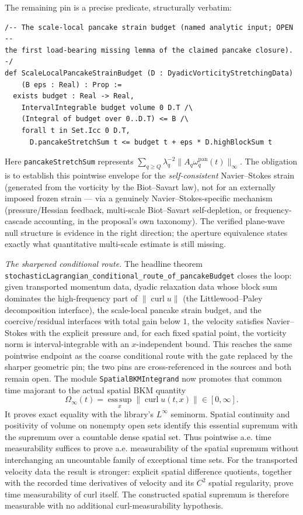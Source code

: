 \documentclass[11pt]{article}
\theoremstyle{definition}
\begin{document}
The remaining pin is a precise predicate, structurally verbatim:
\begin{lstlisting}[language={}]
/-- The scale-local pancake strain budget (named analytic input; OPEN --
the first load-bearing missing lemma of the claimed pancake closure). -/
def ScaleLocalPancakeStrainBudget (D : DyadicVorticityStretchingData)
    (B eps : Real) : Prop :=
  exists budget : Real -> Real,
    IntervalIntegrable budget volume 0 D.T /\
    (Integral of budget over 0..D.T) <= B /\
    forall t in Set.Icc 0 D.T,
      D.pancakeStretchSum t <= budget t + eps * D.highBlockSum t
\end{lstlisting}
Here \texttt{pancakeStretchSum} represents
$\sum_{q\ge Q}\lambda_q^{-2}\|A_q\omega_q^{\mathrm{pan}}(t)\|_\infty$.  The
obligation is to establish this pointwise envelope for the
\emph{self-consistent} Navier--Stokes strain (generated from the vorticity by
the Biot--Savart law), not for an externally imposed frozen strain --- via a
genuinely Navier--Stokes-specific mechanism (pressure/Hessian feedback,
multi-scale Biot--Savart self-depletion, or frequency-cascade accounting, in
the proposal's own taxonomy).  The verified plane-wave null structure is
evidence in the right direction; the aperture equivalence states exactly what
quantitative multi-scale estimate is still missing.

\emph{The sharpened conditional route.}  The headline theorem
\texttt{stochasticLagrangian\_conditional\_route\_of\_pancakeBudget} closes
the loop: given transported momentum data, dyadic relaxation data whose block
sum dominates the high-frequency part of $\|\operatorname{curl}u\|$
(the Littlewood--Paley decomposition interface), the scale-local pancake
strain budget, and the coercive/residual interfaces with total gain below
$1$, the velocity satisfies Navier--Stokes with the explicit pressure and,
for each fixed spatial point, the vorticity norm is interval-integrable with
an $x$-independent bound.  This reaches the same pointwise endpoint as the
coarse conditional route with the gate replaced by the sharper geometric
pin; the two pins are cross-referenced in the sources and both remain open.
The module \texttt{SpatialBKMIntegrand} now promotes that common time
majorant to the actual spatial BKM quantity
\[
 \Omega_\infty(t)=\operatorname*{ess\,sup}_{x}
          \|\operatorname{curl}u(t,x)\|\in[0,\infty].
\]
It proves exact equality with the library's $L^\infty$ seminorm.  Spatial
continuity and positivity of volume on nonempty open sets identify this
essential supremum with the supremum over a countable dense spatial set.
Thus pointwise a.e. time measurability suffices to prove a.e. measurability
of the spatial supremum without interchanging an uncountable family of
exceptional time sets.  For the transported velocity data the result is
stronger: explicit spatial difference quotients, together with the recorded
time derivatives of velocity and its $C^2$ spatial regularity, prove time
measurability of curl itself.  The constructed spatial supremum is therefore
measurable with no additional curl-measurability hypothesis.
\end{document}

